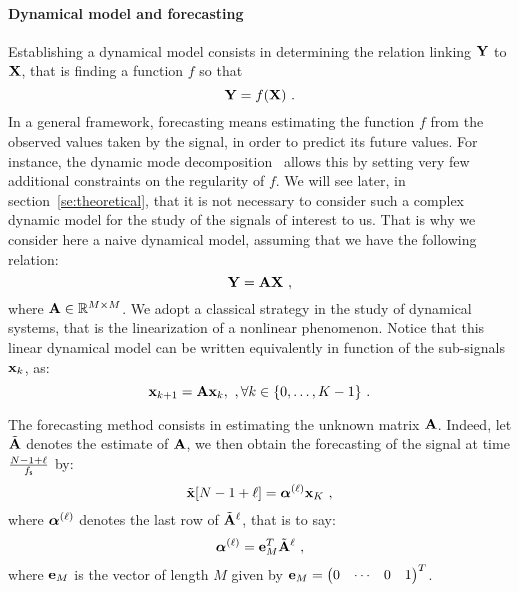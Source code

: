 \paragraph{Dynamical model and forecasting} 
Establishing a dynamical model consists in determining the relation linking ${\mathbf Y}$ to ${\mathbf X}$, that is finding a function $f$ so that
\[
{\mathbf Y} = f({\mathbf X})\ .
\]
In a general framework, forecasting means estimating the function $f$ from the observed values taken by the signal, in order to predict its future values. For instance, the dynamic mode decomposition~\cite{Schmid10dynamic,Williams15data} allows this by setting very few additional constraints on the regularity of $f$. We will see later, in section~\ref{se:theoretical}, that it is not necessary to consider such a complex dynamic model for the study of the signals of interest to us. That is why we consider here a naive dynamical model, assuming that we have the following relation:
\begin{equation}
\bY = \bA\bX\ ,
\label{eq:dyn.model}
\end{equation}
where ${\mathbf A}\in{\mathbb R}^{M\times M}$. We adopt a classical strategy in the study of dynamical systems, that is the linearization of a nonlinear phenomenon. Notice that this linear dynamical model can be written equivalently in function of the sub-signals ${\mathbf x}_k$, as:
\begin{equation}
{\mathbf x}_{k+1} = {\mathbf A}{\mathbf x}_{k},\ ,\forall k\in\{0,\dots,K-1\}\ .
\end{equation}


The forecasting method consists in estimating the unknown matrix ${\mathbf A}$. Indeed, let $\tilde{{\mathbf A}}$ denotes the estimate of ${\mathbf A}$, we then obtain the forecasting of the signal at time $\frac{N-1+\ell}{f_{\mathsf s}}$ by:
\begin{equation}
\label{eq:prediction}
\tilde \bx [N-1+\ell] = \balpha^{(\ell)}\bx_{K}\ ,
\end{equation}  
where $\boldsymbol{\alpha}^{(\ell)}$ denotes the last row of $\tilde{{\mathbf A}}^\ell$, that is to say:
\begin{equation}
\balpha^{(\ell)}=\be_M^T\tilde\bA^\ell\ ,
\label{eq:alpha.l}
\end{equation}
where ${\mathbf e}_M$ is the vector of length $M$ given by ${\mathbf e}_M = \begin{pmatrix} 0 & \cdots & 0 & 1\end{pmatrix}^T$.


